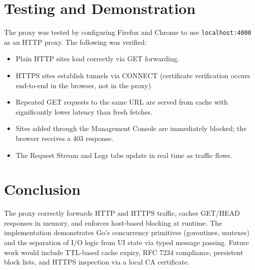 \documentclass[11pt,a4paper]{article}
\begin{document}
\section{Testing and Demonstration}

The proxy was tested by configuring Firefox and Chrome to use
\texttt{localhost:4000} as an HTTP proxy. The following was verified:

\begin{itemize}
  \item Plain HTTP sites load correctly via GET forwarding.
  \item HTTPS sites establish tunnels via CONNECT (certificate verification
    occurs end-to-end in the browser, not in the proxy).
  \item Repeated GET requests to the same URL are served from cache with
    significantly lower latency than fresh fetches.
  \item Sites added through the Management Console are immediately blocked;
    the browser receives a 403 response.
  \item The Request Stream and Logs tabs update in real time as traffic flows.
\end{itemize}

\section{Conclusion}

The proxy correctly forwards HTTP and HTTPS traffic, caches GET/HEAD responses
in memory, and enforces host-based blocking at runtime. The implementation
demonstrates Go's concurrency primitives (goroutines, mutexes) and the
separation of I/O logic from UI state via typed message passing. Future work
would include TTL-based cache expiry, RFC 7234 compliance, persistent block
lists, and HTTPS inspection via a local CA certificate.
\end{document}
